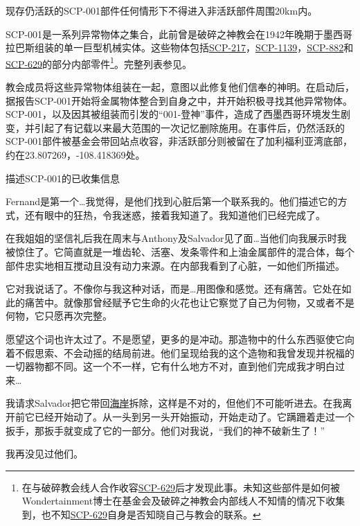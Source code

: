 现存仍活跃的SCP-001部件任何情形下不得进入非活跃部件周围20km内。

SCP-001是一系列异常物体之集合，此前曾是破碎之神教会在1942年晚期于墨西哥拉巴斯组装的单一巨型机械实体。这些物体包括\hyperref[chap:SCP-217]{SCP-217}，\hyperref[chap:SCP-1139]{SCP-1139}，\hyperref[chap:SCP-882]{SCP-882}和\hyperref[chap:SCP-629]{SCP-629}的部分内部零件\footnote{在与破碎教会线人合作收容\hyperref[chap:SCP-629]{SCP-629}后才发现此事。未知这些部件是如何被 Wondertainment博士在基金会及破碎之神教会内部线人不知情的情况下收集到，也不知\hyperref[chap:SCP-629]{SCP-629}自身是否知晓自己与教会的联系。}。完整列表参见。

教会成员将这些异常物体组装在一起，意图以此修复他们信奉的神明。在启动后，据报告SCP-001开始将金属物体整合到自身之中，并开始积极寻找其他异常物体。SCP-001，以及因其被组装而引发的“001-登神”事件，造成了西墨西哥环境发生剧变，并引起了有记载以来最大范围的一次记忆删除施用。在事件后，仍然活跃的SCP-001部件被基金会带回站点收容，非活跃部分则被留在了加利福利亚湾底部，约在23.807269，-108.418369处。

描述SCP-001的已收集信息

\begin{scpbox}


Fernand是第一个…我觉得，是他们找到心脏后第一个联系我的。他们描述它的方式，还有眼中的狂热，令我迷惑，接着我知道了。我知道他们已经完成了。

在我姐姐的坚信礼后我在周末与Anthony及Salvador见了面…当他们向我展示时我被惊住了。它简直就是一堆齿轮、活塞、发条零件和上油金属部件的混合体，每个部件忠实地相互搅动且没有动力来源。在内部我看到了心脏，一如他们所描述。

它对我说话了。不像你与我这种对话，而是…用图像和感觉。还有痛苦。它处在如此的痛苦中。就像那曾经赋予它生命的火花也让它察觉了自己为何物，又或者不是何物，它只愿再次完整。

愿望这个词也许太过了。不是愿望，更多的是冲动。那造物中的什么东西驱使它向着不假思索、不会动摇的结局前进。他们呈现给我的这个造物和我曾发现并祝福的一切器物都不同。这一个不一样，它有什么地方不对，直到他们完成我才明白过来…

我请求Salvador把它带回\hyperref[chap:SCP-2217]{海岸}拆除，这样是不对的，但他们不可能听进去。在我离开前它已经开始动了。从一头到另一头开始振动，开始走动了。它蹒跚着走过一个扳手，那扳手就变成了它的一部分。他们对我说，“我们的神不破新生了！”

我再没见过他们。

\end{scpbox}

